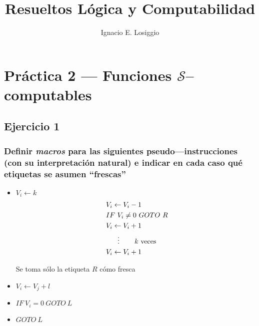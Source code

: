 \documentclass[fleqn, 11pt]{article}
\title{Resueltos Lógica y Computabilidad}
\author{Ignacio E. Losiggio}
\newcommand{\Scur}{\mathcal{S}}
\newcommand{\into}{\leftarrow}
\begin{document}
\maketitle
\section{Práctica 2 --- Funciones $\Scur$--computables}

\subsection{Ejercicio 1}

\subsubsection{Definir \emph{macros} para las siguientes pseudo---instrucciones
(con su interpretación natural) e indicar en cada caso qué etiquetas se asumen
``frescas''}

\begin{itemize}
	\item $V_i \into k$
		\begin{align*}
			[R]\ & V_i \into V_i - 1 \\
			     & IF\ V_i \neq 0\ GOTO\ R \\
			     & V_i \into V_i + 1 \\
			     & \hspace{1.5em} \vdots
			       \hspace{2em}k\ \text{veces} \\
			     & V_i \into V_i + 1
		\end{align*}

		Se toma sólo la etiqueta $R$ cómo fresca
	\item $V_i \into V_j + l$
	\item $IF\ V_i = 0\ GOTO\ L$
	\item $GOTO\ L$
\end{itemize}
\end{document}
